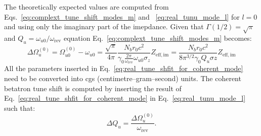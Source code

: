 The theoretically expected values are computed from Eqs.~\eqref{eq:complext_tune_shift_modes_m} and ~\eqref{eq:real_tunu_mode_l} for $l=0$ and using only the imaginary part of the imepdance. Given that $\Gamma(1/2)=\sqrt{\pi}$ and $Q_u = \omega_{u0}/\omega_\mathrm{rev}$ equation Eq.~\eqref{eq:complext_tune_shift_modes_m} becomes:
\begin{equation}\label{eq:real_tune_shfit_for_coherent_mode}
    \Delta \Omega_u^{(0)} =  \Omega_{u0}^{(0)} - \omega_{u0} = \frac{\sqrt{\pi}}{4 \pi}\frac{N_b r_0 c^2}{\gamma_0 \frac{2\pi}{\omega_\mathrm{rev}}\omega_{u0} \sigma_z} Z_\mathrm{eff, im} = \frac{N_b r_0 c^2}{8 \pi^{3/2} \gamma_0 Q_u \sigma z}Z_\mathrm{eff, im}
\end{equation}
All the parameters inserted in Eq.~\eqref{eq:real_tune_shfit_for_coherent_mode} need to be converted into cgs (centimetre–gram–second) units. The coherent betatron tune shift is computed by inserting the result of Eq.~\eqref{eq:real_tune_shfit_for_coherent_mode} in Eq.~\eqref{eq:real_tunu_mode_l} such that: 
\begin{equation}
    \Delta Q_u = \frac{\Delta \Omega_u^{(0)}}{\omega_\mathrm{rev}}.
\end{equation}


